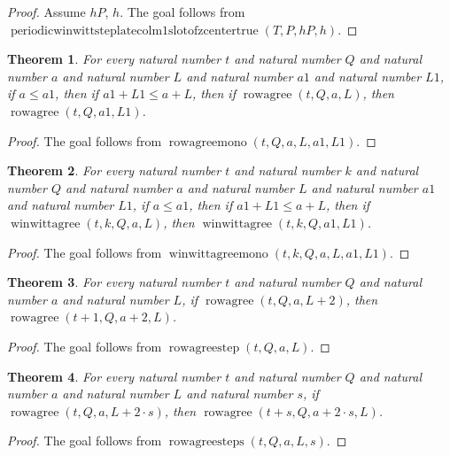 \documentclass[11pt]{article}
\newtheorem{theorem}{Theorem}[section]
\theoremstyle{definition}
\begin{document}
\begin{proof}
Assume \(hP\), \(h\).
The goal follows from \(\operatorname{periodicwinwittsteplatecolm1slotofzcentertrue}(T, P, hP, h)\).
\end{proof}
\begin{theorem}
\label{ll:paper:rowagree-mono}
For every natural number \(t\) and natural number \(Q\) and natural number \(a\) and natural number \(L\) and natural number \(a1\) and natural number \(L1\), if \(a \le a1\), then if \(a1 + L1 \le a + L\), then if \(\operatorname{rowagree}(t, Q, a, L)\), then \(\operatorname{rowagree}(t, Q, a1, L1)\).
\end{theorem}
\begin{proof}
The goal follows from \(\operatorname{rowagreemono}(t, Q, a, L, a1, L1)\).
\end{proof}
\begin{theorem}
\label{ll:paper:winwittagree-mono}
For every natural number \(t\) and natural number \(k\) and natural number \(Q\) and natural number \(a\) and natural number \(L\) and natural number \(a1\) and natural number \(L1\), if \(a \le a1\), then if \(a1 + L1 \le a + L\), then if \(\operatorname{winwittagree}(t, k, Q, a, L)\), then \(\operatorname{winwittagree}(t, k, Q, a1, L1)\).
\end{theorem}
\begin{proof}
The goal follows from \(\operatorname{winwittagreemono}(t, k, Q, a, L, a1, L1)\).
\end{proof}
\begin{theorem}
\label{ll:paper:rowagree-step}
For every natural number \(t\) and natural number \(Q\) and natural number \(a\) and natural number \(L\), if \(\operatorname{rowagree}(t, Q, a, L + 2)\), then \(\operatorname{rowagree}(t + 1, Q, a + 2, L)\).
\end{theorem}
\begin{proof}
The goal follows from \(\operatorname{rowagreestep}(t, Q, a, L)\).
\end{proof}
\begin{theorem}
\label{ll:paper:rowagree-steps}
For every natural number \(t\) and natural number \(Q\) and natural number \(a\) and natural number \(L\) and natural number \(s\), if \(\operatorname{rowagree}(t, Q, a, L + 2 \cdot s)\), then \(\operatorname{rowagree}(t + s, Q, a + 2 \cdot s, L)\).
\end{theorem}
\begin{proof}
The goal follows from \(\operatorname{rowagreesteps}(t, Q, a, L, s)\).
\end{proof}
\end{document}
